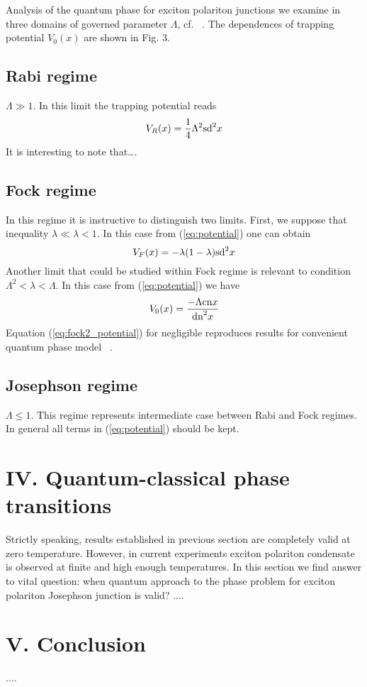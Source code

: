 \documentclass[aps,prl,preprint,groupedaddress]{revtex4-1}
\begin{document}
Analysis of the quantum phase for exciton polariton junctions we examine in three domains of  governed parameter $\Lambda$, cf.  ~\cite{40}. The dependences of  trapping potential $V_0(x)$ are shown in Fig. 3. 
\subsection{Rabi regime}
$\Lambda \gg 1$. In this limit the trapping potential reads
\begin{equation}
V_R(x) = \dfrac{1}{4}\Lambda^2\textrm{sd}^2{x}
\label{eq:rabi_potential}
\end{equation}
It is interesting to note that….
\subsection{Fock regime}
In this regime it is instructive to distinguish two limits.    First, we suppose that inequality $\lambda \ll \lambda < 1$.    In this case from (\ref{eq:potential}) one can obtain
\begin{equation}
V_F(x) = -\lambda(1-\lambda)\textrm{sd}^2{x}
\label{eq:fock1_potential}
\end{equation}
Another limit that could be studied within Fock regime is relevant to condition $\Lambda^2 < \lambda < \Lambda$. In this case  from (\ref{eq:potential}) we have 
\begin{equation}
V_0(x) = \dfrac{-\Lambda\textrm{cn}{x}}{\textrm{dn}^2{x}}
\label{eq:fock2_potential}
\end{equation}
Equation (\ref{eq:fock2_potential}) for negligible    reproduces results for convenient quantum phase model ~\cite{40}. 
\subsection{Josephson regime}
$\Lambda \leq 1$. This regime represents intermediate  case between Rabi and Fock regimes.   In general all terms in (\ref{eq:potential}) should be kept.
\section{IV. Quantum-classical phase transitions}
Strictly speaking,  results  established in previous section are completely valid at  zero temperature. However, in current experiments exciton polariton condensate is observed at finite and high enough temperatures. In this section we find answer to vital question: when quantum approach to the phase problem for exciton polariton Josephson junction is valid?
....
\section{V. Conclusion}
....
\end{document}

